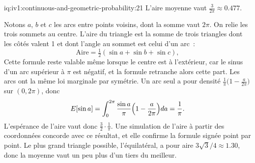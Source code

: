 \begin{solution}{iq:iv1:continuous-and-geometric-probability:21}
L'aire moyenne vaut $\frac{3}{2\pi} \approx 0.477$.

Notons $a$, $b$ et $c$ les arcs entre points voisins, dont la somme vaut $2\pi$. On relie les trois sommets au centre. L'aire du triangle est la somme de trois triangles dont les côtés valent 1 et dont l'angle au sommet est celui d'un arc~:
\[
\text{Aire} = \tfrac12 (\sin a + \sin b + \sin c),
\]
Cette formule reste valable même lorsque le centre est à l'extérieur, car le sinus d'un arc supérieur à $\pi$ est négatif, et la formule retranche alors cette part. Les arcs ont la même loi marginale par symétrie. Un arc seul a pour densité $\frac{1}{\pi}\bigl(1 - \frac{a}{2\pi}\bigr)$ sur $(0, 2\pi)$, donc
\[
E[\sin a] = \int_0^{2\pi} \frac{\sin a}{\pi}\Bigl(1 - \frac{a}{2\pi}\Bigr) da = \frac{1}{\pi}.
\]
L'espérance de l'aire vaut donc $\tfrac32 \cdot \tfrac1\pi$. Une simulation de l'aire à partir des coordonnées concorde avec ce résultat, et elle confirme la formule signée point par point. Le plus grand triangle possible, l'équilatéral, a pour aire $3\sqrt{3}/4 \approx 1.30$, donc la moyenne vaut un peu plus d'un tiers du meilleur.

\end{solution}

